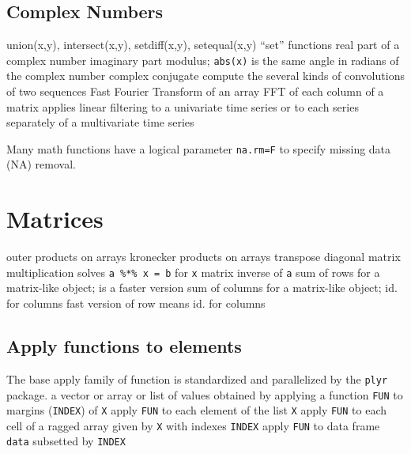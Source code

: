 \subsection{Complex Numbers}{{\smalltt union(x,y),  intersect(x,y),  setdiff(x,y),  setequal(x,y)}}
	{``set'' functions}
	{real part of a complex number}
	{imaginary part}
	{modulus; {\tt abs(x)} is the same}
	{angle in radians of the complex number}
	{complex conjugate}
	{compute the several kinds of convolutions of two sequences}
	{Fast Fourier Transform of an array}
	{FFT of each column of a matrix}
	{applies linear filtering to a univariate time series or to each series separately of a multivariate time series}

Many math functions have a logical parameter {\tt na.rm=F} to
specify missing data (NA) removal.

\section{Matrices}{}

	{outer products on arrays}
	{kronecker products on arrays}
	{transpose}
	{diagonal}
\cmdS{\%*\%}	{matrix multiplication}
	{solves {\tt a \%*\% x = b} for {\tt x}}
	{matrix inverse of {\tt a}}
	{sum of rows for a matrix-like object;}
	{is a faster version}
	{sum of columns for a matrix-like object;}
	{id. for columns}
	{fast version of row means}
	{id. for columns}

\subsection{Apply functions to elements}{The base apply family of function is
    standardized and parallelized by the {\tt plyr} package.}
	{a vector or array or list of values obtained by applying a function {\tt FUN} to margins ({\tt INDEX}) of {\tt X}}
	{apply {\tt FUN} to each element of the list {\tt X}}
	{apply {\tt FUN} to each cell of a ragged array given by {\tt X} with indexes {\tt INDEX}}
	{apply {\tt FUN} to data frame {\tt data} subsetted by {\tt INDEX}}

